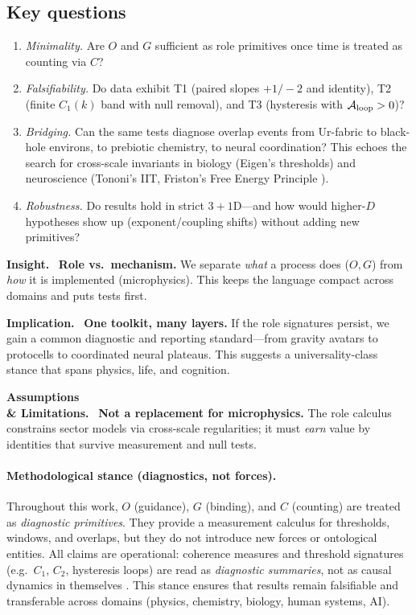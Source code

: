 \documentclass[12pt,a4paper,oneside]{scrreprt}
\newenvironment{insight}{\par\vspace{0.5em}\noindent\textbf{Insight.}\ }{\par\vspace{0.5em}}
\newenvironment{implication}{\par\vspace{0.5em}\noindent\textbf{Implication.}\ }{\par\vspace{0.5em}}
\newenvironment{limitation}{\par\vspace{0.5em}\noindent\textbf{Assumptions \\ \& Limitations.}\ }{\par\vspace{0.5em}}
\begin{document}
\subsection*{Key questions}
\begin{enumerate}
  \item \emph{Minimality.} Are $O$ and $G$ sufficient as role primitives once time is treated as counting via $C$?
  \item \emph{Falsifiability.} Do data exhibit T1 (paired slopes $+1/-2$ and identity), T2 (finite $C_1(k)$ band with null removal), and T3 (hysteresis with $\mathcal A_{\rm loop}>0$)?
  \item \emph{Bridging.} Can the same tests diagnose overlap events from Ur-fabric to black-hole environs, to prebiotic chemistry, to neural coordination? 
  This echoes the search for cross-scale invariants in biology (Eigen's thresholds) and neuroscience (Tononi’s IIT, Friston’s Free Energy Principle \citep{Tononi2004IIT,Friston2010FEP}).
  \item \emph{Robustness.} Do results hold in strict $3{+}1$D---and how would higher-$D$ hypotheses show up (exponent/coupling shifts) without adding new primitives?
\end{enumerate}

\begin{insight}
\textbf{Role vs.\ mechanism.} We separate \emph{what} a process does ($O,G$) from \emph{how} it is implemented (microphysics). 
This keeps the language compact across domains and puts tests first.
\end{insight}

\begin{implication}
\textbf{One toolkit, many layers.} If the role signatures persist, we gain a common diagnostic and reporting standard---from gravity avatars to protocells to coordinated neural plateaus. 
This suggests a universality-class stance that spans physics, life, and cognition.
\end{implication}

\begin{limitation}
\textbf{Not a replacement for microphysics.} The role calculus constrains sector models via cross-scale regularities; it must \emph{earn} value by identities that survive measurement and null tests.
\end{limitation}

\paragraph{Methodological stance (diagnostics, not forces).}
Throughout this work, $O$ (guidance), $G$ (binding), and $C$ (counting) are treated as 
\emph{diagnostic primitives}. They provide a measurement calculus for thresholds, windows, 
and overlaps, but they do not introduce new forces or ontological entities. 
All claims are operational: coherence measures and threshold signatures 
(e.g.\ $C_1$, $C_2$, hysteresis loops) are read as \emph{diagnostic summaries}, 
not as causal dynamics in themselves \cite{friston2006free, bollobas1998random}.
This stance ensures that results remain falsifiable and transferable across 
domains (physics, chemistry, biology, human systems, AI).
\end{document}
